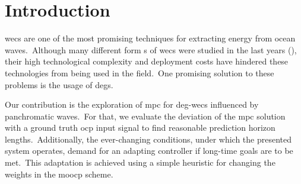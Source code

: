 \section{Introduction}
\acp{wec} are one of the most promising techniques for extracting energy from ocean waves.\ 
Although many different form s of \acp{wec} were studied in the last years (), their high technological complexity and deployment costs have hindered these technologies from being used in the field.\ 
One promising solution to these problems is the usage of \acp{deg}.

Our contribution is the exploration of \ac{mpc} for \ac{deg}-\acp{wec} influenced by panchromatic waves.\ 
For that, we evaluate the deviation of the \ac{mpc} solution with a ground truth \ac{ocp} input signal to find reasonable prediction horizon lengths.\ 
Additionally, the ever-changing conditions, under which the presented system operates, demand for an adapting controller if long-time goals are to be met.\ 
This adaptation is achieved using a simple heuristic for changing the weights in the \ac{moocp} scheme.